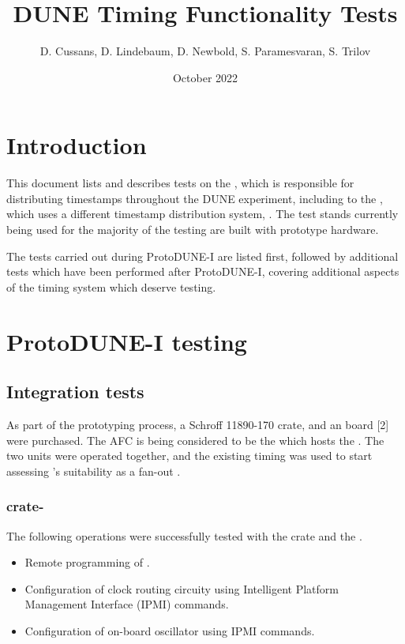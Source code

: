 \documentclass{dune}
\title{DUNE Timing Functionality Tests}
\author{D. Cussans, D. Lindebaum, D. Newbold, S. Paramesvaran, S. Trilov}
\date{October 2022}
\begin{document}
\linenumbers
\maketitle

\tableofcontents


\section{Introduction}
This document lists and describes tests on the , which is responsible for distributing timestamps throughout the DUNE experiment, including to the  , which uses a different timestamp distribution system, .
The test stands currently being used for the majority of the testing are built with prototype hardware.

The tests carried out during ProtoDUNE-I are listed first, followed by additional tests which have been performed after ProtoDUNE-I, covering additional aspects of the timing system which deserve testing.

\section{ProtoDUNE-I testing}
\subsection{Integration tests}
As part of the  prototyping process, a Schroff 11890-170  crate, and an  board [2] were purchased.
The AFC is being considered to be the  which hosts the .
The two units were operated together, and the existing timing  was used to start assessing ’s suitability as a fan-out .

\subsubsection{ crate-}
The following operations were successfully tested with the  crate and the .
\begin{itemize}
    \item Remote programming of  .
    \item Configuration of  clock routing circuity using Intelligent Platform Management Interface (IPMI) commands.
    \item Configuration of  on-board oscillator using IPMI commands.
\end{itemize}
\end{document}
